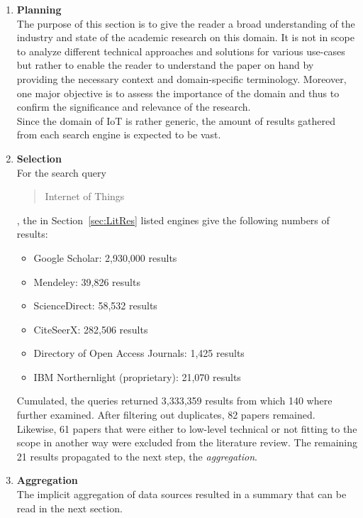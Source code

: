 \begin{enumerate}
    \item
    \textbf{Planning}\\
    The purpose of this section is to give the reader a broad understanding of the industry and state of the academic research on this domain. It is not in scope to analyze different technical approaches and solutions for various use-cases but rather to enable the reader to understand the paper on hand by providing the necessary context and domain-specific terminology. Moreover, one major objective is to assess the importance of the domain and thus to confirm the significance and relevance of the research.\\
    Since the domain of \acf{IoT} is rather generic, the amount of results gathered from each search engine is expected to be vast.
    
    \item
    \textbf{Selection}\\
    For the search query \blockquote{Internet of Things}, the in Section~\vref{sec:LitRes} listed engines give the following numbers of results:
    
    \begin{itemize}[nolistsep]
        \renewcommand\labelitemi{--}
        \item Google Scholar: 2,930,000 results
        \item Mendeley: 39,826 results
        \item ScienceDirect: 58,532 results
        \item CiteSeerX: 282,506 results
        \item Directory of Open Access Journals: 1,425 results
        \item IBM Northernlight (proprietary): 21,070 results
    \end{itemize}
    
    Cumulated, the queries returned 3,333,359 results from which 140 where further examined. After filtering out duplicates, 82 papers remained. Likewise, 61 papers that were either to low-level technical or not fitting to the scope in another way were excluded from the literature review. The remaining 21 results propagated to the next step, the \textit{aggregation}.
    
    \item
    \textbf{Aggregation}\\
    The implicit aggregation of data sources resulted in a summary that can be read in the next section.
    

\end{enumerate}

